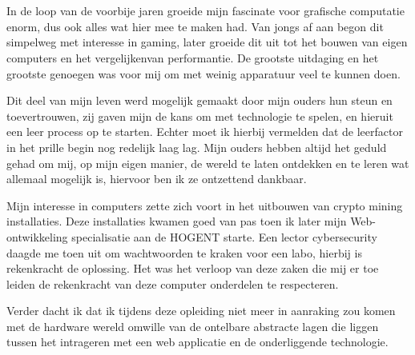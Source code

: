 
\chapter*{}%
\label{ch:voorwoord}


In de loop van de voorbije jaren groeide mijn fascinate voor grafische computatie enorm, dus ook alles wat hier mee te maken had. Van jongs af aan begon dit simpelweg met interesse in gaming, later groeide dit uit tot het bouwen van eigen computers en het vergelijkenvan performantie. De grootste uitdaging en het grootste genoegen was voor mij om met weinig apparatuur veel te kunnen doen. 

\bigbreak{}

Dit deel van mijn leven werd mogelijk gemaakt door mijn ouders hun steun en toevertrouwen, zij gaven mijn de kans om met technologie te spelen, en hieruit een leer process op te starten. Echter moet ik hierbij vermelden dat de leerfactor in het prille begin nog redelijk laag lag. Mijn ouders hebben altijd het geduld gehad om mij, op mijn eigen manier, de wereld te laten ontdekken en te leren wat allemaal mogelijk is, hiervoor ben ik ze ontzettend dankbaar.

\bigbreak{}

Mijn interesse in computers zette zich voort in het uitbouwen van crypto mining installaties. Deze installaties kwamen goed van pas toen ik later mijn Web-ontwikkeling specialisatie aan de HOGENT starte. Een lector cybersecurity daagde me toen uit om wachtwoorden te kraken voor een labo, hierbij is rekenkracht de oplossing. Het was het verloop van deze zaken die mij er toe leiden de rekenkracht van deze computer onderdelen te respecteren. 

\bigbreak{}

Verder dacht ik dat ik tijdens deze opleiding niet meer in aanraking zou komen met de hardware wereld omwille van de ontelbare abstracte lagen die liggen tussen het intrageren met een web applicatie en de onderliggende technologie.

